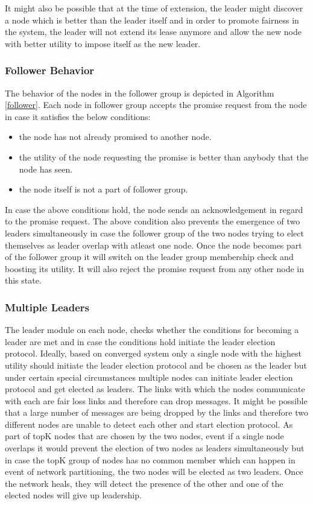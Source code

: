 \documentclass[12pt,a4paper,twoside,openright]{book}
\begin{document}
It might also be possible that at the time of extension, the leader might discover a node which is better than the leader itself and in order to promote fairness in the system, the leader will not extend its lease anymore and allow the new node with better utility to impose itself as the new leader.


\subsubsection{Follower Behavior}

The behavior of the nodes in the follower group is depicted in Algorithm \ref{follower}. Each node in follower group accepts the promise request from the node in case it satisfies the below conditions:

\begin{itemize}
\item the node has not already promised to another node.
\item the utility of the node requesting the promise is better than anybody that the node has seen.
\item the node itself is not a part of follower group.
\end{itemize}

In case the above conditions hold, the node sends an acknowledgement in regard to the promise request. The above condition also prevents the emergence of two leaders simultaneously in case the follower group of the two nodes trying to elect themselves as leader overlap with atleast one node. Once the node becomes part of the follower group it will switch on the leader group membership check and boosting its utility. It will also reject the promise request from any other node in this state.




\subsubsection{Multiple Leaders}

The leader module on each node, checks whether the conditions for becoming a leader are met and in case the conditions hold initiate the leader election protocol. Ideally, based on converged system only a single node with the highest utility should initiate the leader election protocol and be chosen as the leader but under certain special circumstances multiple nodes can initiate leader election protocol and get elected as leaders. The links with which the nodes communicate with each are fair loss links and therefore can drop messages. It might be possible that a large number of messages are being dropped by the links and therefore two different nodes are unable to detect each other and start election protocol. As part of topK nodes that are chosen by the two nodes, event if a single node overlaps it would prevent the election of two nodes as leaders simultaneously but in case the topK group of nodes has no common member which can happen in event of network partitioning, the two nodes will be elected as two leaders. Once the network heals, they will detect the presence of the other and one of the elected nodes will give up leadership. 
\end{document}
